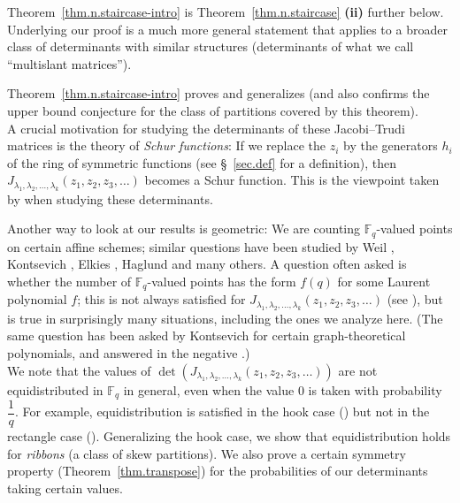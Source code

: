 \documentclass[numbers=enddot,12pt,final,onecolumn,notitlepage]{scrartcl}%
\theoremstyle{definition}
\newcommand{\tup}[1]{\left( #1 \right)}
\newcommand{\Fq}{\mathbb{F}_q}
\theoremstyle{plainsl}
\begin{document}
Theorem~\ref{thm.n.staircase-intro} is
Theorem~\ref{thm.n.staircase} \textbf{(ii)} further below.
Underlying
our proof is a much more general statement that applies to a broader
class of determinants with similar structures (determinants of
what we call ``multislant matrices'').

Theorem~\ref{thm.n.staircase-intro} proves and generalizes \cite[Conjecture 10.1]{Anzis18} (and also confirms the upper bound conjecture \cite[Conjecture 5.10]{Anzis18} for the class of partitions covered by this theorem).
\\

A crucial motivation for studying the determinants of these Jacobi--Trudi matrices
is the theory of \emph{Schur functions}:
If we replace the $z_{i}$ by the generators $h_{i}$ of the
ring of symmetric functions (see \S~\ref{sec.def} for a definition), then
$J_{\lambda_1, \lambda_2, \ldots, \lambda_k}\tup{z_1, z_2, z_3, \ldots}$ becomes a Schur
function.
This is the viewpoint taken by \cite{Anzis18} when studying these determinants. 

Another way to look at our results is geometric: We are counting $\Fq$-valued points on certain affine schemes;
similar questions have been studied by Weil \cite{Weil}, Kontsevich \cite{Kontsevich, Stembridge, RPStan, Belkale2003}, Elkies \cite{Elkies}, Haglund \cite{Haglund} and many others.
A question often asked is whether the number of $\Fq$-valued points has the form $f\tup{q}$ for some Laurent polynomial $f$; this is not always satisfied for $J_{\lambda_1, \lambda_2, \ldots, \lambda_k}\tup{z_1, z_2, z_3, \ldots}$ (see \cite[Proposition 5.7]{Anzis18}), but is true in surprisingly many situations, including the ones we analyze here. (The same question has been asked by Kontsevich for certain graph-theoretical polynomials, and answered in the negative \cite{Belkale2003}.)
\\

We note that the values of $\det\tup{ J_{\lambda_1, \lambda_2, \ldots, \lambda_k}\tup{z_1, z_2, z_3, \ldots} }$ are not equidistributed in $\Fq$ in general, even when the value $0$ is taken with probability $\dfrac{1}{q}$. For example, equidistribution is satisfied in the hook case (\cite[Proposition 1.2]{Anzis18}) but not in the rectangle case (\cite[Lemma 9.3]{Anzis18}). Generalizing the hook case, we show that equidistribution holds for \emph{ribbons} (a class of skew partitions).
We also prove a certain symmetry property (Theorem~\ref{thm.transpose}) for the probabilities of our determinants taking certain values.
\end{document}

